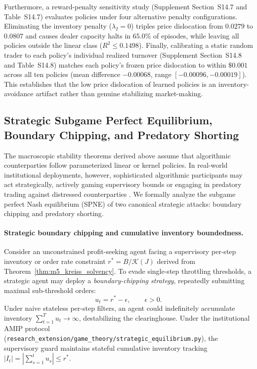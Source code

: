 \documentclass[10pt,twocolumn,letterpaper]{article}
\theoremstyle{definition}
\theoremstyle{remark}
\begin{document}
Furthermore, a reward-penalty sensitivity study (Supplement Section~S14.7 and Table~S14.7) evaluates policies under four alternative penalty configurations. Eliminating the inventory penalty ($\lambda_I = 0$) triples price dislocation from $0.0279$ to $0.0807$ and causes dealer capacity halts in $65.0\%$ of episodes, while leaving all policies outside the linear class ($R^2 \le 0.1498$). Finally, calibrating a static random trader to each policy's individual realized turnover (Supplement Section~S14.8 and Table~S14.8) matches each policy's frozen price dislocation to within $\$0.001$ across all ten policies (mean difference $-0.00068$, range $[-0.00096, -0.00019]$). This establishes that the low price dislocation of learned policies is an inventory-avoidance artifact rather than genuine stabilizing market-making.

\subsection{Strategic Subgame Perfect Equilibrium, Boundary Chipping, and Predatory Shorting}
\label{sec:strategic_game_theory}
The macroscopic stability theorems derived above assume that algorithmic counterparties follow parameterized linear or kernel policies. In real-world institutional deployments, however, sophisticated algorithmic participants may act strategically, actively gaming supervisory bounds or engaging in predatory trading against distressed counterparties \citep{brunnermeier2005predatory}. We formally analyze the subgame perfect Nash equilibrium (SPNE) of two canonical strategic attacks: boundary chipping and predatory shorting.

\paragraph{Strategic boundary chipping and cumulative inventory boundedness.}
Consider an unconstrained profit-seeking agent facing a supervisory per-step inventory or order rate constraint $r^* = B / \mathcal{K}(J)$ derived from Theorem~\ref{thm:m5_kreiss_solvency}. To evade single-step throttling thresholds, a strategic agent may deploy a \textit{boundary-chipping strategy}, repeatedly submitting maximal sub-threshold orders:
\begin{equation}
u_t = r^* - \epsilon, \qquad \epsilon > 0.
\end{equation}
Under naive stateless per-step filters, an agent could indefinitely accumulate inventory $\sum_{t=1}^T u_t \to \infty$, destabilizing the clearinghouse. Under the institutional AMIP protocol (\texttt{research\_extension/game\_theory/strategic\_equilibrium.py}), the supervisory guard maintains stateful cumulative inventory tracking $|I_t| = |\sum_{s=1}^t u_s| \le r^*$.
\end{document}
